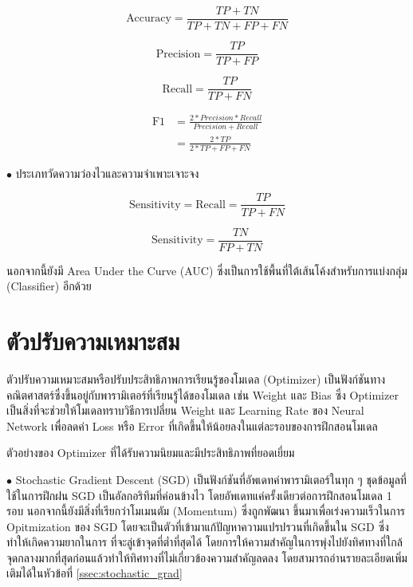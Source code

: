 \begin{equation}
    \text{Accuracy} = \frac{TP+TN}{TP+TN+FP+FN}
\end{equation}

\begin{equation}
    \text{Precision} = \frac{TP}{TP+FP}
\end{equation}

\begin{equation}
    \text{Recall} = \frac{TP}{TP+FN}
\end{equation}

\begin{align}
    \text{F1} &= \frac{2*Precision*Recall}{Precision+Recall} \nonumber \\
    &= \frac{2*TP}{2*TP+FP+FN}
\end{align}

\noindent $\bullet$ ประเภทวัดความว่องไวและความจำเพาะเจาะจง

\begin{equation}
    \text{Sensitivity} = \text{Recall} = \frac{TP}{TP+FN}
\end{equation}

\begin{equation}
    \text{Sensitivity} = \frac{TN}{FP+TN}
\end{equation}

\noindent นอกจากนี้ยังมี Area Under the Curve (AUC) ซึ่งเป็นการใช้พื้นที่ใต้เส้นโค้งสำหรับการแบ่งกลุ่ม (Classifier) อีกด้วย

\section{ตัวปรับความเหมาะสม}
\label{sec:optimizer}

ตัวปรับความเหมาะสมหรือปรับประสิทธิภาพการเรียนรู้ของโมเดล (Optimizer) เป็นฟังก์ชันทางคณิตศาสตร์ซึ่งขึ้นอยู่กับพารามิเตอร์ที่เรียนรู้ได้ของโมเดล 
เช่น Weight และ Bias ซึ่ง Optimizer เป็นสิ่งที่จะช่วยให้โมเดลทราบวิธีการเปลี่ยน Weight และ Learning Rate ของ Neural Network 
เพื่อลดค่า Loss หรือ Error ที่เกิดขึ้นให้น้อยลงในแต่ละรอบของการฝึกสอนโมเดล

\noindent ตัวอย่างของ Optimizer ที่ได้รับความนิยมและมีประสิทธิภาพที่ยอดเยี่ยม

\noindent $\bullet$ Stochastic Gradient Descent (SGD) เป็นฟังก์ชันที่อัพเดทค่าพารามิเตอร์ในทุก ๆ ชุดข้อมูลที่ใช้ในการฝึกฝน SGD 
เป็นอัลกอริทึมที่ค่อนข้างไว โดยอัพเดทแค่ครั้งเดียวต่อการฝึกสอนโมเดล 1 รอบ นอกจากนี้ยังมีสิ่งที่เรียกว่าโมเมนตัม (Momentum) ซึ่งถูกพัฒนา%
ขึ้นมาเพื่อเร่งความเร็วในการ Opitmization ของ SGD โดยจะเป็นตัวที่เข้ามาแก้ปัญหาความแปรปรวนที่เกิดขึ้นใน SGD ซึ่งทำให้เกิดความยากในการ%
ที่จะลู่เข้าจุดที่ต่ำที่สุดได้ โดยการให้ความสำคัญในการพุ่งไปยังทิศทางที่ใกล้จุดกลางมากที่สุดก่อนแล้วทำให้ทิศทางที่ไม่เกี่ยวข้องความสำคัญลดลง
โดยสามารถอ่านรายละเอียดเพิ่มเติมได้ในหัวข้อที่ \ref{ssec:stochastic_grad}

